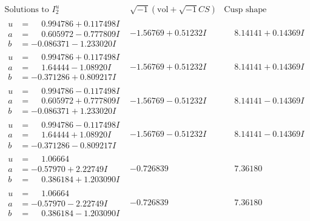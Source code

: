 \documentclass[1p]{elsarticle_modified}
\theoremstyle{definition}
\newcommand{\I}{\sqrt{-1}}
\begin{document}
$$\begin{array}{c|c|c}  
\text{Solutions to }I^u_{2}& \I (\text{vol} + \sqrt{-1}CS) & \text{Cusp shape}\\
 \hline 
\begin{aligned}
u &= \phantom{-}0.994786 + 0.117498 I \\
a &= \phantom{-}0.605972 - 0.777809 I \\
b &= -0.086371 - 1.233020 I\end{aligned}
 & -1.56769 + 0.51232 I & \phantom{-}8.14141 + 0.14369 I \\ \hline\begin{aligned}
u &= \phantom{-}0.994786 + 0.117498 I \\
a &= \phantom{-}1.64444 - 1.08920 I \\
b &= -0.371286 + 0.809217 I\end{aligned}
 & -1.56769 + 0.51232 I & \phantom{-}8.14141 + 0.14369 I \\ \hline\begin{aligned}
u &= \phantom{-}0.994786 - 0.117498 I \\
a &= \phantom{-}0.605972 + 0.777809 I \\
b &= -0.086371 + 1.233020 I\end{aligned}
 & -1.56769 - 0.51232 I & \phantom{-}8.14141 - 0.14369 I \\ \hline\begin{aligned}
u &= \phantom{-}0.994786 - 0.117498 I \\
a &= \phantom{-}1.64444 + 1.08920 I \\
b &= -0.371286 - 0.809217 I\end{aligned}
 & -1.56769 - 0.51232 I & \phantom{-}8.14141 - 0.14369 I \\ \hline\begin{aligned}
u &= \phantom{-}1.06664\phantom{ +0.000000I} \\
a &= -0.57970 + 2.22749 I \\
b &= \phantom{-}0.386184 + 1.203090 I\end{aligned}
 & -0.726839\phantom{ +0.000000I} & \phantom{-}7.36180\phantom{ +0.000000I} \\ \hline\begin{aligned}
u &= \phantom{-}1.06664\phantom{ +0.000000I} \\
a &= -0.57970 - 2.22749 I \\
b &= \phantom{-}0.386184 - 1.203090 I\end{aligned}
 & -0.726839\phantom{ +0.000000I} & \phantom{-}7.36180\phantom{ +0.000000I} \\ \hline\begin{aligned}

\end{aligned}
\end{array}$$
\end{document}
